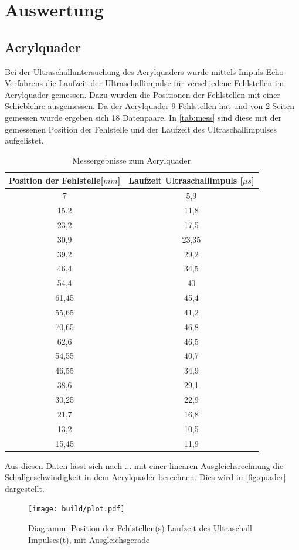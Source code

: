 \section{Auswertung}
\label{sec:Auswertung}
\subsection{Acrylquader}
Bei der Ultraschalluntersuchung des Acrylquaders wurde mittels Impuls-Echo-Verfahrens die Laufzeit der Ultraschallimpulse für verschiedene Fehlstellen im Acrylquader gemessen. Dazu wurden die Positionen der Fehlstellen mit einer Schieblehre ausgemessen. Da der Acrylquader 9 Fehlstellen hat und von 2 Seiten gemessen wurde ergeben sich 18 Datenpaare. In \autoref{tab:mess} sind diese mit der gemessenen Position der Fehlstelle und der Laufzeit des Ultraschallimpulses aufgelistet.
\begin{table}
  \centering
  \caption{Messergebnisse zum Acrylquader}
\label{tab:mess}
  \begin{tabular}{c c }
  \toprule
  Position der Fehlstelle[$mm$] & Laufzeit Ultraschallimpuls [$\mu s$]\\
  \midrule
  7 & 5,9 \\
  15,2 & 11,8 \\
  23,2 & 17,5 \\
  30,9 & 23,35 \\
  39,2 & 29,2 \\
  46,4 & 34,5 \\
  54,4 & 40 \\
  61,45 & 45,4 \\
  55,65 & 41,2 \\
  70,65 & 46,8 \\
  62,6 & 46,5 \\
  54,55 & 40,7 \\
  46,55 & 34,9 \\
  38,6 & 29,1 \\
  30,25 & 22,9 \\
  21,7 & 16,8 \\
  13,2 & 10,5 \\
  15,45 & 11,9 \\
  \bottomrule
  \end{tabular}
\end{table} 
\newpage
Aus diesen Daten lässt sich nach ... mit einer linearen Ausgleichsrechnung die Schallgeschwindigkeit in dem Acrylquader berechnen. Dies wird in \autoref{fig:quader} dargestellt.
\begin{figure}[H]
  \centering
  \texttt{[image: build/plot.pdf]}
  \caption{Diagramm: Position der Fehlstellen(s)-Laufzeit des Ultraschall Impulses(t), mit Ausgleichsgerade}
  \label{fig:quader}
\end{figure}

